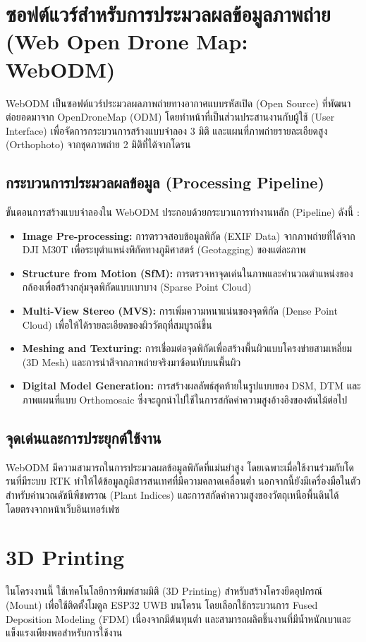 \section{ซอฟต์แวร์สำหรับการประมวลผลข้อมูลภาพถ่าย (Web Open Drone Map: WebODM)}
WebODM เป็นซอฟต์แวร์ประมวลผลภาพถ่ายทางอากาศแบบรหัสเปิด (Open Source) ที่พัฒนาต่อยอดมาจาก OpenDroneMap (ODM) โดยทำหน้าที่เป็นส่วนประสานงานกับผู้ใช้ (User Interface) เพื่อจัดการกระบวนการสร้างแบบจำลอง 3 มิติ และแผนที่ภาพถ่ายรายละเอียดสูง (Orthophoto) จากชุดภาพถ่าย 2 มิติที่ได้จากโดรน \cite{tozzi2021webodm}

\subsection{กระบวนการประมวลผลข้อมูล (Processing Pipeline)}
ขั้นตอนการสร้างแบบจำลองใน WebODM ประกอบด้วยกระบวนการทำงานหลัก (Pipeline) ดังนี้ \cite{luca2019opendronemap}:
\begin{itemize}
        \item \textbf{Image Pre-processing:} การตรวจสอบข้อมูลพิกัด (EXIF Data) จากภาพถ่ายที่ได้จาก DJI M30T เพื่อระบุตำแหน่งพิกัดทางภูมิศาสตร์ (Geotagging) ของแต่ละภาพ
        \item \textbf{Structure from Motion (SfM):} การตรวจหาจุดเด่นในภาพและคำนวณตำแหน่งของกล้องเพื่อสร้างกลุ่มจุดพิกัดแบบเบาบาง (Sparse Point Cloud)
        \item \textbf{Multi-View Stereo (MVS):} การเพิ่มความหนาแน่นของจุดพิกัด (Dense Point Cloud) เพื่อให้ได้รายละเอียดของผิววัตถุที่สมบูรณ์ขึ้น
        \item \textbf{Meshing and Texturing:} การเชื่อมต่อจุดพิกัดเพื่อสร้างพื้นผิวแบบโครงข่ายสามเหลี่ยม (3D Mesh) และการนำสีจากภาพถ่ายจริงมาซ้อนทับบนพื้นผิว
        \item \textbf{Digital Model Generation:} การสร้างผลลัพธ์สุดท้ายในรูปแบบของ DSM, DTM และภาพแผนที่แบบ Orthomosaic ซึ่งจะถูกนำไปใช้ในการสกัดค่าความสูงอ้างอิงของต้นไม้ต่อไป
\end{itemize}

\subsection{จุดเด่นและการประยุกต์ใช้งาน}
WebODM มีความสามารถในการประมวลผลข้อมูลพิกัดที่แม่นยำสูง โดยเฉพาะเมื่อใช้งานร่วมกับโดรนที่มีระบบ RTK ทำให้ได้ข้อมูลภูมิสารสนเทศที่มีความคลาดเคลื่อนต่ำ นอกจากนี้ยังมีเครื่องมือในตัวสำหรับคำนวณดัชนีพืชพรรณ (Plant Indices) และการสกัดค่าความสูงของวัตถุเหนือพื้นดินได้โดยตรงจากหน้าเว็บอินเทอร์เฟซ \cite{tozzi2021webodm}

\section{3D Printing}
ในโครงงานนี้ ใช้เทคโนโลยีการพิมพ์สามมิติ (3D Printing) สำหรับสร้างโครงยึดอุปกรณ์ (Mount) เพื่อใช้ติดตั้งโมดูล ESP32 UWB บนโดรน โดยเลือกใช้กระบวนการ Fused Deposition Modeling (FDM) เนื่องจากมีต้นทุนต่ำ และสามารถผลิตชิ้นงานที่มีน้ำหนักเบาและแข็งแรงเพียงพอสำหรับการใช้งาน \cite{depa_3d_printing, sync_innovation_3dprinting}
